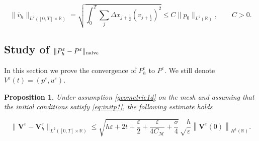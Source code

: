 \documentclass[a4paper,french,english,10pt]{article}
\newcommand\eps{\varepsilon}
\newcommand\V{\mathbf{V}}
\newtheorem{proposition}[theorem]{Proposition}
\begin{document}
\begin{equation}\label{l2}
 \|\bar{v}_{h}\|_{L^2([0,T]\times\mathbb{R})}
=
\sqrt{
\int_0^T \sum_j \Delta x_{j+\frac12} (v_{j+\frac12} )^2
}
\leq
C\|p_0\|_{L^2(\mathbb R)}, \qquad C>0.
\end{equation}

\subsection{Study of $\| P_h^\varepsilon - P^\varepsilon   \|_{ {\rm naive}}$}


In this section we  
prove the 
convergence of $P_h^\varepsilon $ to  $P^\varepsilon $. We still denote $V^\eps(t)=(p^\eps,u^\eps)$.
\begin{proposition}\label{cv1d}
Under assumption \ref{geometrie1d} on the mesh and assuming that the initial conditions satisfy \eqref{eq:initp1}, the following estimate holds 

\begin{equation*}
\|\V^{\eps}-\V^{\eps}_h \|_{L^2([0,T]\times \mathbb{R})}
\leq \sqrt{h\eps + 2t + \frac{\eps}{2} + \frac{\eps}{4C_{\mathcal{M}}} + \frac{\sigma}{4} }
\sqrt \frac{h}\eps 
\left\| \V^{\eps}(0)
\right\|_{H^1(\mathbb{R})}.
\end{equation*}

\end{proposition}
\end{document}
